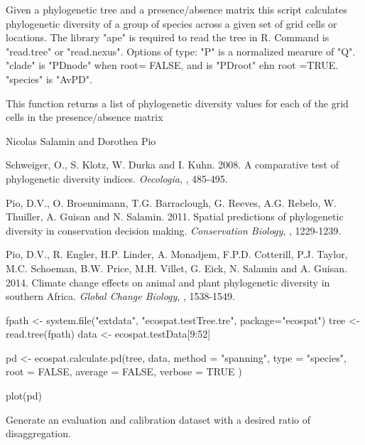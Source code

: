 \documentclass[a4paper]{book}
\begin{document}
%
\begin{Details}\relax
Given a phylogenetic tree and a presence/absence matrix this script calculates phylogenetic diversity of a group of species across a given set of grid cells or locations. The library "ape" is required to read the tree in R. Command is "read.tree" or "read.nexus".
Options of type:
"P" is a normalized mearure of "Q".
"clade" is "PDnode" when root= FALSE, and is "PDroot" ehn root =TRUE.
"species" is "AvPD".
\end{Details}
%
\begin{Value}
This function returns a list of phylogenetic diversity values for each of the grid cells in the presence/absence matrix
\end{Value}
%
\begin{Author}\relax
Nicolas Salamin  and Dorothea Pio 
\end{Author}
%
\begin{References}\relax
Schweiger, O., S. Klotz, W. Durka and I. Kuhn. 2008. A comparative test of phylogenetic diversity indices. \emph{Oecologia}, , 485-495.

Pio, D.V., O. Broennimann, T.G. Barraclough, G. Reeves, A.G. Rebelo, W. Thuiller, A. Guisan and N. Salamin. 2011. Spatial predictions of phylogenetic diversity in conservation decision making. \emph{Conservation Biology}, , 1229-1239.

Pio, D.V., R. Engler, H.P. Linder, A. Monadjem, F.P.D. Cotterill, P.J. Taylor, M.C. Schoeman, B.W. Price, M.H. Villet, G. Eick, N. Salamin and A. Guisan. 2014. Climate change effects on animal and plant phylogenetic diversity in southern Africa. \emph{Global Change Biology}, , 1538-1549.
\end{References}
%
\begin{Examples}
\begin{ExampleCode}
fpath <- system.file("extdata", "ecospat.testTree.tre", package="ecospat")
tree <-read.tree(fpath)
data <- ecospat.testData[9:52] 

pd <- ecospat.calculate.pd(tree, data, method = "spanning", type = "species", root = FALSE, 
average = FALSE, verbose = TRUE )

plot(pd)
\end{ExampleCode}
\end{Examples}
%
\begin{Description}\relax
Generate an evaluation and calibration dataset with a desired ratio of disaggregation.
\end{Description}
\end{document}
